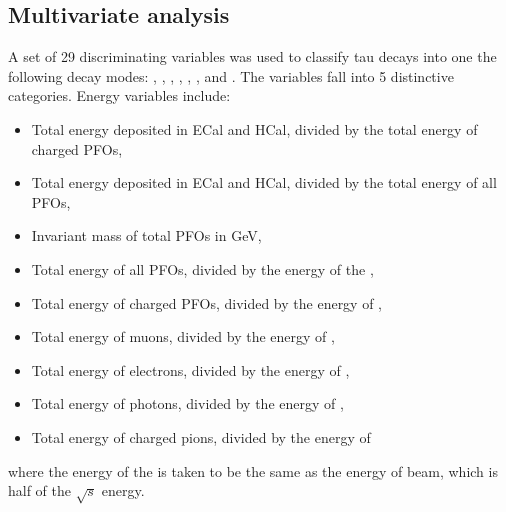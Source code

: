 \documentclass[a4paper,11pt]{article}
\newcommand{\decayElectron}{\Pem\PAGne\PGnGt}
\newcommand{\decayMuon}{\PGmm\PAGnGm\PGnGt}
\newcommand{\decayPion}{\PGpm\PGnGt}
\newcommand{\decayRho}{\PGrP{\PGpm\PGpz}\PGnGt}
\newcommand{\decayAiPhoton}{\PaDoP{\PGpm\PGpz\PGpz}\PGnGt}
\newcommand{\decayAiPion}{\PaDoP{\PGpm\PGpm\PGpp}\PGnGt}
\newcommand{\decayThreePionPhoton}{\PGpm\PGpm\PGpp\PGpz\PGnGt}
\newcommand{\rootS}{\ensuremath{\sqrt{s}} }
\begin{document}



\subsection{Multivariate analysis}



A set of 29 discriminating variables was used to classify tau decays into one the following decay modes: \decayElectron, \decayMuon, \decayPion, \decayRho, \decayAiPhoton, \decayAiPion, and \decayThreePionPhoton. The variables fall into 5 distinctive categories. Energy variables include:
\begin{itemize}
\item  Total energy deposited in ECal and HCal, divided by the total energy of charged PFOs,  
\item  Total energy deposited in ECal and HCal, divided by the total energy of all PFOs,  
\item  Invariant mass of total PFOs in GeV,   
\item  Total energy of all PFOs, divided by the energy of the \PGtm, 
\item  Total energy of charged PFOs, divided by the energy of \PGtm,    
\item  Total energy of muons, divided by the energy of \PGtm,    
\item  Total energy of electrons, divided by the energy of \PGtm,
\item  Total energy of photons, divided by the energy of \PGtm,  
\item  Total energy of charged pions, divided by the energy of \PGtm    
\end{itemize}
where the energy of the \PGt is taken to be the same as the energy of \Pepm beam, which is half of the \rootS energy. 
\end{document}
